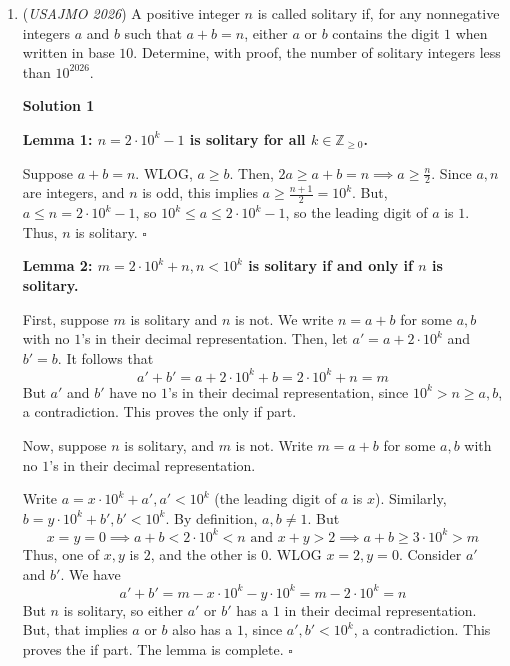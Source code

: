 \begin{enumerate}
 $\overline{OI}$ bisects $\angle AOB$. It follows that
 \[\angle AOI=\angle EOY'=\angle BOI =\angle COY',\]or $\overline{OY'}$ bisects $\angle COE$, and $\angle EOY'=\angle COY'\implies EY'=CY'\implies \angle EAY'=\angle CAY'$. We obtain that $AY'$ bisects $\angle CAO$. By the definition of the $A$-excenter of $\triangle ABO$,  $\overline{OX}$ bisects $\angle BOE$. We have
 \[\angle BOX=\angle COF=\angle EOX =\angle AOF,\]or $\angle AOF=\angle COF$. Since $\overline{OF}$ is the angle bisector of $\angle AOC$, we have $I'=\overline{AY'}\cap\overline{OF}$ is the incenter of $\triangle AOC$.

 We know that $A,I',Y$ are collinear, and $Y$ lies on $\overrightarrow{OY'}$, the external bisector of $\angle AOC$. Therefore, $Y'=Y$, as desired.

 


	\item (\textit{USAJMO 2026}) A positive integer $n$ is called solitary if, for any nonnegative integers $a$ and $b$ such that $a+b=n$, either $a$ or $b$ contains the digit $1$ when written in base $10$. Determine, with proof, the number of solitary integers less than $10^{2026}$.


 



\textbf{Solution 1}

\textbf{Lemma 1: $n=2\cdot 10^k-1$ is solitary for all $k\in \mathbb{Z}_{\geq 0}$.}

 Suppose $a+b=n$. WLOG, $a\geq b$. Then, $2a\geq a+b=n\implies a \geq \frac{n}{2}$. Since $a, n$ are integers, and $n$ is odd, this implies $a \geq \frac{n+1}{2}=10^k$. But, $a\leq n = 2\cdot 10^k-1$, so $10^k \leq a \leq 2\cdot 10^k-1$, so the leading digit of $a$ is $1$. Thus, $n$ is solitary. $\square$

 
\textbf{Lemma 2: $m=2\cdot 10^k+n, n < 10^k$ is solitary if and only if $n$ is solitary.}

 First, suppose $m$ is solitary and $n$ is not. We write $n=a+b$ for some $a, b$ with no $1$'s in their decimal representation. Then, let $a' = a +2\cdot 10^k$ and $b' = b$. It follows that 
 \[a'+b' = a+2\cdot 10^k+b=2\cdot 10^k+n=m\]But $a'$ and $b'$ have no $1$'s in their decimal representation, since $10^k > n \geq a, b$, a contradiction. This proves the only if part.

 
Now, suppose $n$ is solitary, and $m$ is not. Write $m=a+b$ for some $a, b$ with no $1$'s in their decimal representation.

 Write $a = x\cdot 10^k+a', a'< 10^k$ (the leading digit of $a$ is $x$). Similarly, $b = y\cdot 10^k+b', b'< 10^k$. By definition, $a, b \neq 1$. But 
 \[x=y=0\implies a+b< 2\cdot 10^k < n \text{ and } x + y > 2\implies a+b\geq 3\cdot 10^k > m\] Thus, one of $x, y$ is $2$, and the other is $0$. WLOG $x=2, y=0$. Consider $a'$ and $b'$. We have 
 \[a'+b' = m- x\cdot 10^k -y\cdot 10^k =m - 2\cdot 10^k = n\] But $n$ is solitary, so either $a'$ or $b'$ has a $1$ in their decimal representation. But, that implies $a$ or $b$ also has a $1$, since $a', b' < 10^k$, a contradiction. This proves the if part. The lemma is complete. $\square$


\end{enumerate}

